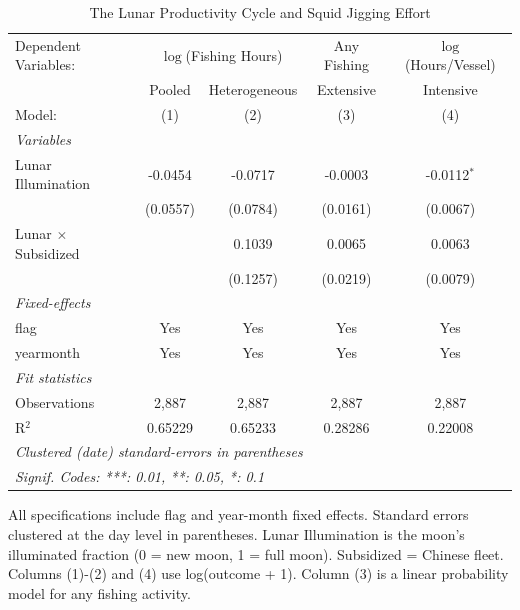 
\begin{table}[htbp]
   \caption{\label{tab:main} The Lunar Productivity Cycle and Squid Jigging Effort}
   \centering
   \begin{tabular}{lcccc}
      \tabularnewline \midrule \midrule
      Dependent Variables: & \multicolumn{2}{c}{$\log$(Fishing Hours)} & Any Fishing & $\log$(Hours/Vessel)\\
                                 & Pooled   & Heterogeneous & Extensive & Intensive \\   
      Model:                     & (1)      & (2)           & (3)       & (4)\\  
      \midrule
      \emph{Variables}\\
      Lunar Illumination         & -0.0454  & -0.0717       & -0.0003   & -0.0112$^{*}$\\   
                                 & (0.0557) & (0.0784)      & (0.0161)  & (0.0067)\\   
      Lunar $\times$ Subsidized  &          & 0.1039        & 0.0065    & 0.0063\\   
                                 &          & (0.1257)      & (0.0219)  & (0.0079)\\   
      \midrule
      \emph{Fixed-effects}\\
      flag                       & Yes      & Yes           & Yes       & Yes\\  
      yearmonth                  & Yes      & Yes           & Yes       & Yes\\  
      \midrule
      \emph{Fit statistics}\\
      Observations               & 2,887    & 2,887         & 2,887     & 2,887\\  
      R$^2$                      & 0.65229  & 0.65233       & 0.28286   & 0.22008\\  
      \midrule \midrule
      \multicolumn{5}{l}{\emph{Clustered (date) standard-errors in parentheses}}\\
      \multicolumn{5}{l}{\emph{Signif. Codes: ***: 0.01, **: 0.05, *: 0.1}}\\
   \end{tabular}
   
   \par \raggedright 
   All specifications include flag and year-month fixed effects. Standard errors clustered at the day level in parentheses. Lunar Illumination is the moon's illuminated fraction (0 = new moon, 1 = full moon). Subsidized = Chinese fleet. Columns (1)-(2) and (4) use log(outcome + 1). Column (3) is a linear probability model for any fishing activity.
\end{table}


